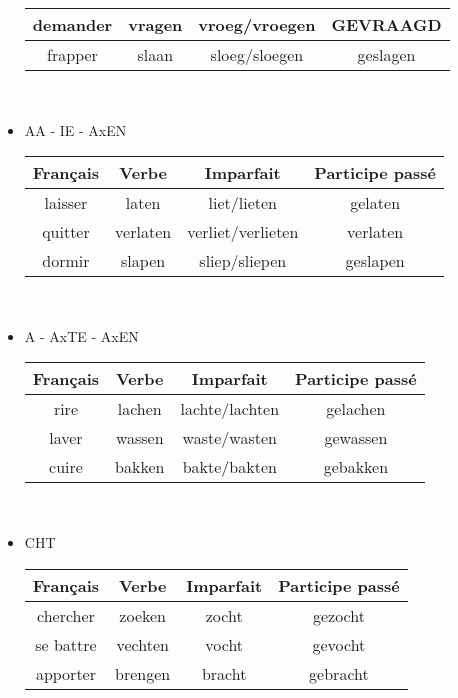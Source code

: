 \documentclass[a4paper]{article}
\begin{document}
\begin{itemize}[label=\textbullet, font=\Large]
\begin{center}
\begin{tabular}{|c|c|c|c|}
      \hline
      demander & vragen & vroeg/vroegen & GEVRAAGD\\
      \hline
      frapper & slaan & sloeg/sloegen & geslagen\\
      \hline
    \end{tabular}\\
  \end{center}
  \item AA - IE - AxEN
  \begin{center}
    \begin{tabular}{|c|c|c|c|}
      \hline
      \textbf{Français} & \textbf{Verbe} & \textbf{Imparfait} & \textbf{Participe passé}\\
      \hline
      laisser & laten & liet/lieten & gelaten\\
      \hline
      quitter & verlaten & verliet/verlieten & verlaten\\
      \hline
      dormir & slapen & sliep/sliepen & geslapen\\
      \hline
    \end{tabular}\\
  \end{center}
  \item A - AxTE - AxEN
  \begin{center}
    \begin{tabular}{|c|c|c|c|}
      \hline
      \textbf{Français} & \textbf{Verbe} & \textbf{Imparfait} & \textbf{Participe passé}\\
      \hline
      rire & lachen & lachte/lachten & gelachen\\
      \hline
      laver & wassen & waste/wasten & gewassen\\
      \hline
      cuire & bakken & bakte/bakten & gebakken\\
      \hline
    \end{tabular}\\
  \end{center}
  \item CHT
  \begin{center}
    \begin{tabular}{|c|c|c|c|}
      \hline
      \textbf{Français} & \textbf{Verbe} & \textbf{Imparfait} & \textbf{Participe passé}\\
      \hline
      chercher & zoeken & zocht & gezocht\\
      \hline
      se battre & vechten & vocht & gevocht\\
      \hline
      apporter & brengen & bracht & gebracht\\

\end{tabular}
\end{center}
\end{itemize}
\end{document}
